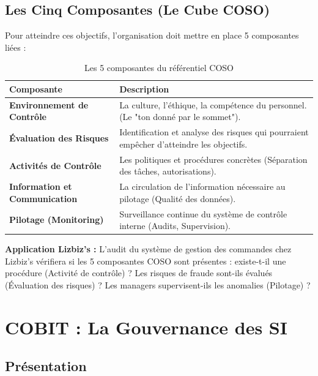 \subsection{Les Cinq Composantes (Le Cube COSO)}

Pour atteindre ces objectifs, l'organisation doit mettre en place 5 composantes liées :

\begin{table}[h!]
\centering
\small
\begin{tabular}{p{4cm}p{8cm}}
    \toprule
    \textbf{Composante} & \textbf{Description} \\
    \midrule
    \textbf{Environnement de Contrôle} & La culture, l'éthique, la compétence du personnel. (Le "ton donné par le sommet"). \\
    \textbf{Évaluation des Risques} & Identification et analyse des risques qui pourraient empêcher d'atteindre les objectifs. \\
    \textbf{Activités de Contrôle} & Les politiques et procédures concrètes (Séparation des tâches, autorisations). \\
    \textbf{Information et Communication} & La circulation de l'information nécessaire au pilotage (Qualité des données). \\
    \textbf{Pilotage (Monitoring)} & Surveillance continue du système de contrôle interne (Audits, Supervision). \\
    \bottomrule
\end{tabular}
\caption{Les 5 composantes du référentiel COSO}
\end{table}

\begin{boxlizbiz}
\textbf{Application Lizbiz's :}
L'audit du système de gestion des commandes chez Lizbiz's vérifiera si les 5 composantes COSO sont présentes : existe-t-il une procédure (Activité de contrôle) ? Les risques de fraude sont-ils évalués (Évaluation des risques) ? Les managers supervisent-ils les anomalies (Pilotage) ?
\end{boxlizbiz}

\section{COBIT : La Gouvernance des SI}

\subsection{Présentation}

